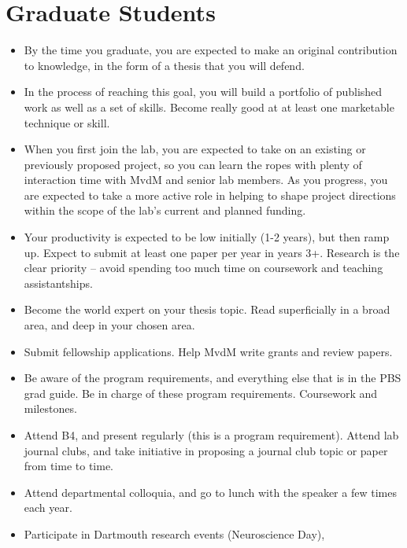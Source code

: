 \documentclass{tufte-book}
\begin{document}
\section{Graduate Students}\label{sec:gradstudents}

\begin{itemize}
\item{By the time you graduate, you are expected to make an original
  contribution to knowledge, in the form of a thesis that you will
  defend.} 
\item{In the process of reaching this goal, you will build a portfolio
  of published work as well as a set of skills. Become really good at
  at least one marketable technique or skill.}
\item{When you first join the lab, you are expected to take on an existing
or previously proposed project, so you can learn the ropes with plenty
of interaction time with MvdM and senior lab members. As you progress,
you are expected to take a more active role in helping to shape
project directions within the scope of the lab's current and planned
funding.}
\item{Your productivity is expected to be low initially (1-2 years), but
then ramp up. Expect to submit at least one paper per year in years
3+. Research is the clear priority -- avoid spending too much time on
coursework and teaching assistantships.}
\item{Become the world expert on your thesis topic. Read superficially
  in a broad area, and deep in your chosen area.}
\item{Submit fellowship applications. Help MvdM write grants and review
papers.}
\item{Be aware of the program requirements, and everything else that is in
the PBS grad guide.  Be in charge of these program
requirements. Coursework and milestones.}
\item{Attend B4, and present regularly (this is a program
  requirement). Attend lab journal clubs, and take initiative in
  proposing a journal club topic or paper from time to time.}
\item{Attend departmental colloquia, and go to lunch with the speaker a few
times each year.}
\item{Participate in Dartmouth research events (Neuroscience Day),
}
\end{itemize}
\end{document}
